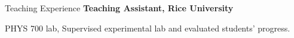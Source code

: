 \begin{rubric}{Teaching Experience}
%
\entry*[      2015]%
  \textbf{Teaching Assistant, Rice University}
  \par PHYS 700 lab, Supervised experimental lab and evaluated students' progress.
\end{rubric}

